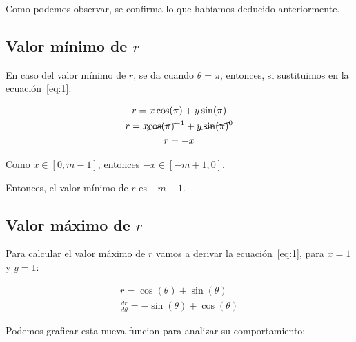 \documentclass[11pt]{article}
\begin{document}
    Como podemos observar, se confirma lo que habíamos deducido anteriormente.

    \subsection{Valor mínimo de $r$}\label{subsec:min_r}

    En caso del valor mínimo de $r$, se da cuando $\theta = \pi$,
    entonces, si sustituimos en la ecuación~\ref{eq:1}:

    \begin{gather*}
        r = x \cos(\pi) + y \sin(\pi)\\
        r = x \cancel{\cos(\pi)}^{-1} + \cancel{y \sin(\pi)}^0\\
        r = -x
    \end{gather*}

    Como $x \in [0, m-1]$, entonces $-x \in [-m+1, 0]$.

    Entonces, el valor mínimo de $r$ es $-m+1$.

    \subsection{Valor máximo de $r$}\label{subsec:max_r}

    Para calcular el valor máximo de $r$ vamos a derivar la ecuación~\ref{eq:1},
    para $x = 1$ y $y = 1$:

    \begin{gather*}
        r = \cos(\theta) + \sin(\theta)\\
        \frac{dr}{d\theta} = - \sin(\theta) + \cos(\theta)
    \end{gather*}

    Podemos graficar esta nueva funcion para analizar su comportamiento:

\end{document}
